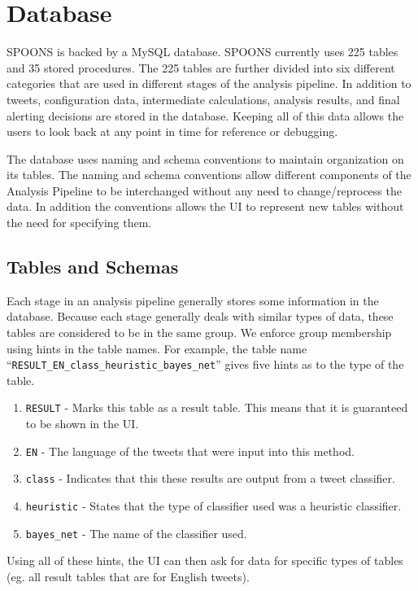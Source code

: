\documentclass[12pt]{ucthesis}
\begin{document}
\chapter{Database}
\label{arch-database}
SPOONS is backed by a MySQL database. SPOONS currently uses 225 tables and 35 stored procedures. The 225 tables are further divided into
six different categories that are used in different stages of the analysis pipeline. In addition to tweets,
configuration data, intermediate calculations, analysis results, and final alerting decisions are stored in the database. Keeping all of this
data allows the users to look back at any point in time for reference or debugging.

The database uses naming and schema conventions to maintain organization on its tables. The naming and schema conventions allow different
components of the Analysis Pipeline to be interchanged without any need to change/reprocess the data. In addition the conventions allows the UI
to represent new tables without the need for specifying them.

\section{Tables and Schemas}
\label{arch-database-tables}
Each stage in an analysis pipeline generally stores some information in the database. Because each stage generally deals with similar
types of data, these tables are considered to be in the same group. We enforce group membership using hints in the table names. For example, the
table name ``\texttt{RESULT\_EN\_class\_heuristic\_bayes\_net}'' gives five hints as to the type of the table.

\begin{enumerate}
   \item \texttt{RESULT} - Marks this table as a result table. This means that it is guaranteed to be shown in the UI.
   \item \texttt{EN} - The language of the tweets that were input into this method.
   \item \texttt{class} - Indicates that this these results are output from a tweet classifier.
   \item \texttt{heuristic} - States that the type of classifier used was a heuristic classifier.
   \item \texttt{bayes\_net} - The name of the classifier used.
\end{enumerate}

Using all of these hints, the UI can then ask for data for specific types of tables (eg. all result tables that are for English tweets).
\end{document}
